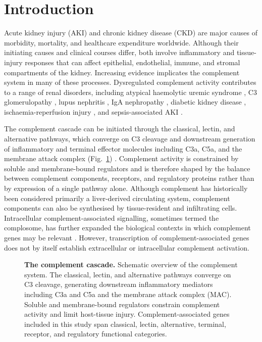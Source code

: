\documentclass[10pt,letterpaper]{article}
\begin{document}
\section*{Introduction}

Acute kidney injury (AKI) and chronic kidney disease (CKD) are major causes of morbidity, mortality, and healthcare expenditure worldwide. Although their initiating causes and clinical courses differ, both involve inflammatory and tissue-injury responses that can affect epithelial, endothelial, immune, and stromal compartments of the kidney. Increasing evidence implicates the complement system in many of these processes. Dysregulated complement activity contributes to a range of renal disorders, including atypical haemolytic uremic syndrome \cite{wongFunctionalCharacterizationRare2021}, C3 glomerulopathy \cite{smithC3GlomerulopathyUnderstanding2019a}, lupus nephritis \cite{walportComplementSystemicLupus2002a}, IgA nephropathy \cite{menonRolePodocyteInjury2013}, diabetic kidney disease \cite{jiangActivationComplementPathways2022}, ischaemia-reperfusion injury \cite{thurmanC3aRequiredProduction2007}, and sepsis-associated AKI \cite{markiewskiComplexityComplementActivation2008}.

The complement cascade can be initiated through the classical, lectin, and alternative pathways, which converge on C3 cleavage and downstream generation of inflammatory and terminal effector molecules including C3a, C5a, and the membrane attack complex (Fig.~\ref{fig1}) \cite{walportComplementSecondTwo2001,walportComplementFirstTwo2001}. Complement activity is constrained by soluble and membrane-bound regulators and is therefore shaped by the balance between complement components, receptors, and regulatory proteins rather than by expression of a single pathway alone. Although complement has historically been considered primarily a liver-derived circulating system, complement components can also be synthesised by tissue-resident and infiltrating cells. Intracellular complement-associated signalling, sometimes termed the complosome, has further expanded the biological contexts in which complement genes may be relevant \cite{westComplosomeIntracellularComplement2023}. However, transcription of complement-associated genes does not by itself establish extracellular or intracellular complement activation.

\begin{figure}[!h]
\caption{\textbf{The complement cascade.}
Schematic overview of the complement system. The classical, lectin, and alternative pathways converge on C3 cleavage, generating downstream inflammatory mediators including C3a and C5a and the membrane attack complex (MAC). Soluble and membrane-bound regulators constrain complement activity and limit host-tissue injury. Complement-associated genes included in this study span classical, lectin, alternative, terminal, receptor, and regulatory functional categories.}
\label{fig1}
\end{figure}
\end{document}
